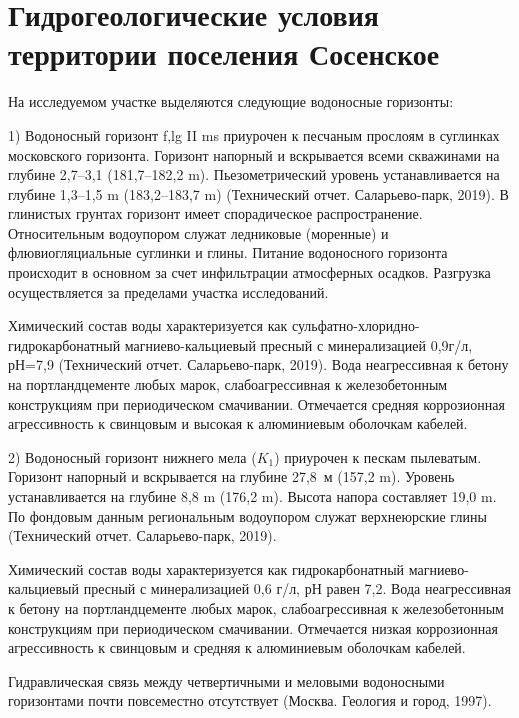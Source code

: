 \chapter{Гидрогеологические условия территории поселения Сосенское}\label{ch:ch4}

На исследуемом участке выделяются следующие водоносные горизонты:

1) Водоносный горизонт f,lg II ms приурочен к песчаным прослоям в суглинках московского горизонта. 
Горизонт напорный и вскрывается всеми скважинами 
на глубине 2,7--3,1 (181,7--182,2 \si{\meter}). 
Пьезометрический уровень устанавливается 
на глубине 1,3--1,5 \si{\meter} (183,2--183,7 \si{\meter}) (Технический отчет. Саларьево-парк, 2019). 
В глинистых грунтах горизонт имеет спорадическое распространение. 
Относительным водоупором служат ледниковые (моренные) 
и флювиогляциальные суглинки и глины. Питание водоносного горизонта 
происходит в основном за счет инфильтрации атмосферных осадков. 
Разгрузка осуществляется за пределами участка исследований.

Химический состав воды характеризуется как сульфатно-хлоридно-гидрокарбонатный 
магниево-кальциевый пресный 
с минерализацией 0,9г/л, рН=7,9 (Технический отчет. Саларьево-парк, 2019). Вода неагрессивная к бетону на 
портландцементе любых марок, слабоагрессивная 
к железобетонным конструкциям при периодическом смачивании. 
Отмечается средняя коррозионная агрессивность 
к свинцовым и высокая к алюминиевым оболочкам кабелей.

2) Водоносный горизонт нижнего мела ($K_1$) приурочен к пескам пылеватым. 
Горизонт напорный и вскрывается 
на глубине 27,8~м (157,2 \si{\meter}). Уровень устанавливается 
на глубине 8,8 \si{\meter} (176,2 \si{\meter}). 
Высота напора составляет 19,0 \si{\meter}. 
По фондовым данным региональным водоупором 
служат верхнеюрские глины (Технический отчет. Саларьево-парк, 2019).

Химический состав воды характеризуется как гидрокарбонатный магниево-кальциевый 
пресный с минерализацией 0,6 г/л, 
рН равен 7,2. 
Вода неагрессивная к бетону на портландцементе любых марок, 
слабоагрессивная к железобетонным конструкциям 
при периодическом смачивании. Отмечается низкая коррозионная агрессивность 
к свинцовым и средняя к алюминиевым оболочкам кабелей.

Гидравлическая связь между четвертичными и меловыми водоносными горизонтами 
почти повсеместно отсутствует (Москва. Геология и город, 1997).
